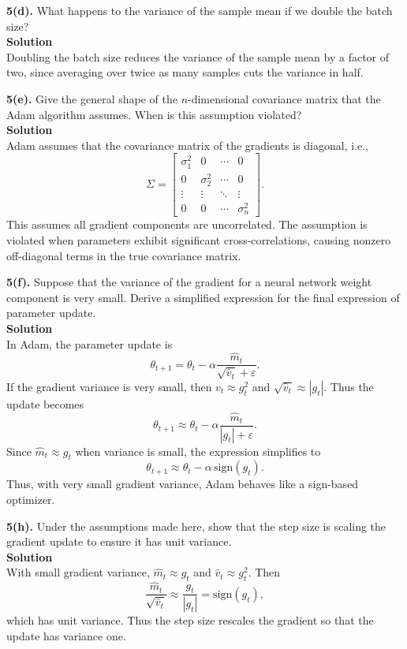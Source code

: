 \documentclass[11pt]{article}
\begin{document}
	\vspace{0.5em}
	\noindent\textbf{5(d).} What happens to the variance of the sample mean if we double the batch
	size?\\
	\noindent\textbf{Solution}\\
	Doubling the batch size reduces the variance of the sample mean by a factor of two,
	since averaging over twice as many samples cuts the variance in half.
	
	\newpage
	
	\vspace{0.5em}
	\noindent\textbf{5(e).} Give the general shape of the \(n\)-dimensional covariance matrix that the
	Adam algorithm assumes. When is this assumption violated?\\
	\noindent\textbf{Solution}\\
	Adam assumes that the covariance matrix of the gradients is diagonal, i.e.,
	\[
	\Sigma = 
	\begin{bmatrix}
		\sigma_1^2 & 0 & \cdots & 0 \\
		0 & \sigma_2^2 & \cdots & 0 \\
		\vdots & \vdots & \ddots & \vdots \\
		0 & 0 & \cdots & \sigma_n^2
	\end{bmatrix}.
	\]
	This assumes all gradient components are uncorrelated. The assumption is violated
	when parameters exhibit significant cross-correlations, causing nonzero
	off-diagonal terms in the true covariance matrix.
	
	\vspace{0.5em}
	\noindent\textbf{5(f).} Suppose that the variance of the gradient for a neural network weight
	component is very small. Derive a simplified expression for the final expression of parameter update.\\
	\noindent\textbf{Solution}\\
	In Adam, the parameter update is
	\[
	\theta_{t+1}
	= \theta_t
	- \alpha \frac{\hat{m}_t}{\sqrt{\hat{v}_t} + \varepsilon}.
	\]
	If the gradient variance is very small, then
	\(
	v_t \approx g_t^2
	\)
	and
	\(
	\sqrt{\hat{v}_t} \approx |g_t|.
	\)
	Thus the update becomes
	\[
	\theta_{t+1}
	\approx \theta_t
	- \alpha \frac{\hat{m}_t}{|g_t| + \varepsilon}.
	\]
	Since \(\hat{m}_t \approx g_t\) when variance is small, the expression simplifies to
	\[
	\theta_{t+1}
	\approx \theta_t - \alpha\, \text{sign}(g_t).
	\]
	Thus, with very small gradient variance, Adam behaves like a sign-based optimizer.
	
	\vspace{0.5em}
	\noindent\textbf{5(h).} Under the assumptions made here, show that the step size is scaling the gradient update to ensure it has unit variance.\\
	\noindent\textbf{Solution}\\
	With small gradient variance, \(\hat{m}_t \approx g_t\) and
	\(\hat{v}_t \approx g_t^2\). Then
	\[
	\frac{\hat{m}_t}{\sqrt{\hat{v}_t}}
	\approx \frac{g_t}{|g_t|}
	= \text{sign}(g_t),
	\]
	which has unit variance. Thus the step size rescales the gradient so that the
	update has variance one.
	
\end{document}
